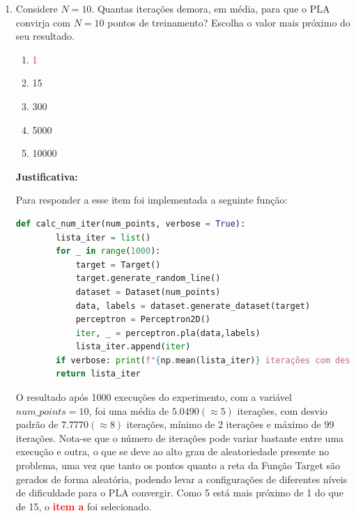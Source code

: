 \begin{enumerate}
    \item Considere $N = 10$. Quantas iterações demora, em média, para que o PLA convirja com $N = 10$
    pontos de treinamento? Escolha o valor mais próximo do seu resultado.

    \begin{enumerate}
        \item[\textcolor{red}{(a)}]\textcolor{red}{1}\addtocounter{enumii}{1}
        \item 15
        \item 300
        \item 5000
        \item 10000
    \end{enumerate}
     
    \par

    \textbf{Justificativa:}

    Para responder a esse item foi implementada a seguinte função:

    \begin{lstlisting}[language=Python, caption=Cálculo do número de iterações, label=cod:perceptron_num_iter]
        def calc_num_iter(num_points, verbose = True):
        lista_iter = list()
        for _ in range(1000):
            target = Target()
            target.generate_random_line()
            dataset = Dataset(num_points)
            data, labels = dataset.generate_dataset(target)
            perceptron = Perceptron2D()
            iter, _ = perceptron.pla(data,labels)
            lista_iter.append(iter)
        if verbose: print(f"{np.mean(lista_iter)} iterações com desvio padrão {np.std(lista_iter):.4f} (min:{np.min(lista_iter)}, máx:{np.max(lista_iter)})")
        return lista_iter
    \end{lstlisting}

    O resultado após 1000 execuções do experimento, com a variável $num\_points = 10$, foi uma média de $5.0490(\approx 5)$ iterações, com desvio padrão de $7.7770(\approx 8)$ iterações, mínimo de 2 iterações e máximo de 99 iterações. Nota-se que o número de iterações pode variar bastante entre uma execução e outra, o que se deve ao alto grau de aleatoriedade presente no problema, uma vez que tanto os pontos quanto a reta da Função Target são gerados de forma aleatória, podendo levar a configurações de diferentes níveis de dificuldade para o PLA convergir. 
     Como 5 está mais próximo de 1 do que de 15, o \textcolor{red}{\textbf{item a}} foi selecionado. 
    

\end{enumerate}
